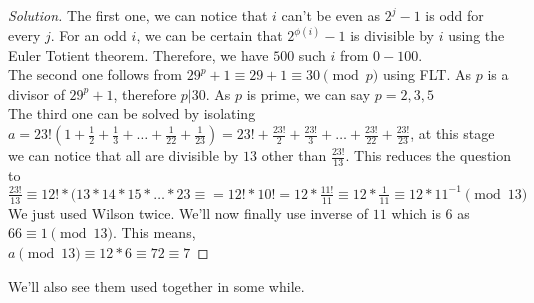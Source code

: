 \begin{proof}
    [Solution]
    The first one, we can notice that $i$ can't be even as $2^j-1$ is odd for every $j$. For an odd $i$, we can be certain that $2^{\phi(i)}-1$ is divisible by $i$ using the Euler Totient theorem. Therefore, we have $500$ such $i$ from $0-100$.\\
    The second one follows from $29^p+1 \equiv 29+1 \equiv 30 \pmod{p}$ using FLT. As $p$ is a divisor of $29^p+1$, therefore $p|30$. As $p$ is prime, we can say $p=2,3,5$\\
    The third one can be solved by isolating $a=23!(1+\frac{1}{2}+\frac{1}{3}+\dots+\frac{1}{22}+\frac{1}{23})=23!+\frac{23!}{2}+\frac{23!}{3}+\dots+\frac{23!}{22}+\frac{23!}{23}$, at this stage we can notice that all are divisible by $13$ other than $\frac{23!}{13}$. This reduces the question to $\frac{23!}{13} \equiv 12!*(13*14*15*\dots*23 \equiv = 12!*10! = 12*\frac{11!}{11}\equiv 12*\frac{1}{11} \equiv 12*11^{-1}  \pmod{13}$\\
    We just used Wilson twice. We'll now finally use inverse of $11$ which is $6$ as $66 \equiv 1 \pmod{13}$. This means,\\
    $a \pmod{13} \equiv 12*6 \equiv 72 \equiv 7$
\end{proof}
We'll also see them used together in some while.
